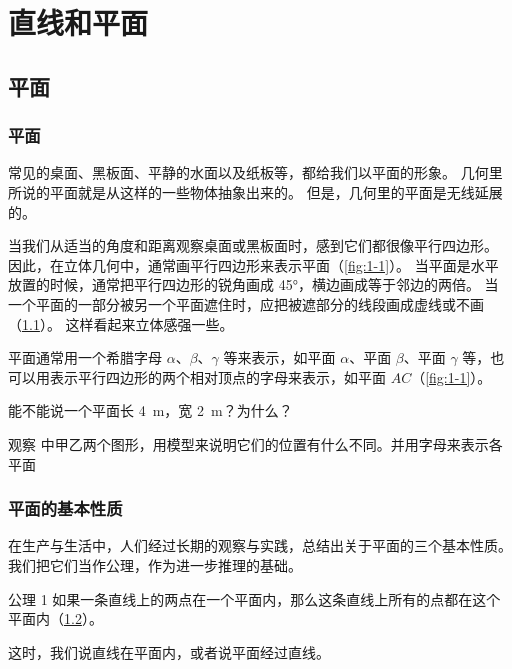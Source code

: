 \chapter{直线和平面}
\section{平面}
\subsection{平面}
常见的桌面、黑板面、平静的水面以及纸板等，都给我们以平面的形象。
几何里所说的平面就是从这样的一些物体抽象出来的。
但是，几何里的平面是无线延展的。

当我们从适当的角度和距离观察桌面或黑板面时，感到它们都很像平行四边形。
因此，在立体几何中，通常画平行四边形来表示平面（\cref{fig:1-1}）。
当平面是水平放置的时候，通常把平行四边形的锐角画成 \ang{45}，横边画成等于邻边的两倍。
当一个平面的一部分被另一个平面遮住时，应把被遮部分的线段画成虚线或不画（\cref{fig:1-2}）。
这样看起来立体感强一些。
\begin{figure}
  \begin{minipage}[b]{0.33\linewidth}\centering
    \caption{}\label{fig:1-1}
  \end{minipage}
  \begin{minipage}[b]{0.6\linewidth}\centering
    \caption{}\label{fig:1-2}
  \end{minipage}
\end{figure}

平面通常用一个希腊字母 $\alpha$、$\beta$、$\gamma$ 等来表示，如平面 $\alpha$、平面 $\beta$、平面 $\gamma$ 等，也可以用表示平行四边形的两个相对顶点的字母来表示，如平面 $AC$（\cref{fig:1-1}）。
\begin{Practice}
  \begin{question}
    \item 能不能说一个平面长 \qty{4}{m}，宽 \qty{2}{m}？为什么？
    \item \label{prac:1-2}观察 中甲乙两个图形，用模型来说明它们的位置有什么不同。并用字母来表示各平面
    \begin{figurehere}
      \begin{minipage}{\linewidth}
        \caption*{（第 \ref{prac:1-2} 题）}
      \end{minipage}
    \end{figurehere}
  \end{question}
\end{Practice}

\subsection{平面的基本性质}
在生产与生活中，人们经过长期的观察与实践，总结出关于平面的三个基本性质。
我们把它们当作公理，作为进一步推理的基础。
\begin{Theorem}{公理 1}
  如果一条直线上的两点在一个平面内，那么这条直线上所有的点都在这个平面内（\cref{fig:1-3}）。
\end{Theorem}
这时，我们说直线在平面内，或者说平面经过直线。
\begin{figure}
  \caption{}\label{fig:1-3}
\end{figure}

